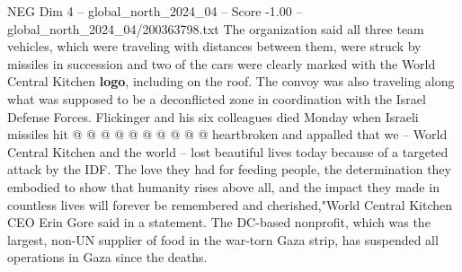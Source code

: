 \begin{textsample}{NEG Dim 4 – global\_north\_2024\_04 – Score -1.00 – global\_north\_2024\_04/200363798.txt}
The organization said all three team vehicles, which were traveling with distances between them, were struck by missiles in succession and two of the cars were clearly marked with the World Central Kitchen \textbf{logo}, including on the roof.
The convoy was also traveling along what was supposed to be a deconflicted zone in coordination with the Israel Defense Forces.
Flickinger and his six colleagues died Monday when Israeli missiles hit @ @ @ @ @ @ @ @ @ @ heartbroken and appalled that we -- World Central Kitchen and the world -- lost beautiful lives today because of a targeted attack by the IDF.
The love they had for feeding people, the determination they embodied to show that humanity rises above all, and the impact they made in countless lives will forever be remembered and cherished,"World Central Kitchen CEO Erin Gore said in a statement.
The DC-based nonprofit, which was the largest, non-UN supplier of food in the war-torn Gaza strip, has suspended all operations in Gaza since the deaths.

\end{textsample}
